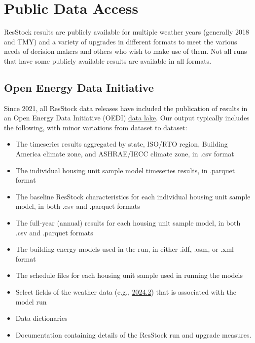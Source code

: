 \chapter{Public Data Access}

ResStock results are publicly available for multiple weather years (generally 2018 and TMY) and a variety of upgrades in different formats to meet the various needs of decision makers and others who wish to make use of them. Not all runs that have some publicly available results are available in all formats.

\section{Open Energy Data Initiative}  
Since 2021, all ResStock data releases have included the publication of results in an Open Energy Data Initiative (OEDI) \href{https://data.openei.org/s3_viewer?bucket=oedi-data-lake&prefix=nrel-pds-building-stock%2Fend-use-load-profiles-for-us-building-stock}{data lake}. Our output typically includes the following, with minor variations from dataset to dataset:
\begin{itemize}
    \item The timeseries results aggregated by state, ISO/RTO region, Building America climate zone, and ASHRAE/IECC climate zone, in .csv format
    \item The individual housing unit sample model timeseries results, in .parquet format
    \item The baseline ResStock characteristics for each individual housing unit sample model, in both .csv and .parquet formats
    \item The full-year (annual) results for each housing unit sample model, in both .csv and .parquet formats
    \item The building energy models used in the run, in either .idf, .osm, or .xml format
    \item The schedule files for each housing unit sample used in running the models
    \item Select fields of the weather data (e.g., \href{https://data.openei.org/s3_viewer?bucket=oedi-data-lake&prefix=nrel-pds-building-stock%2Fend-use-load-profiles-for-us-building-stock%2F2024%2Fresstock_tmy3_release_2%2Fweather%2F}{2024.2}) that is associated with the model run
    \item Data dictionaries
    \item Documentation containing details of the ResStock run and upgrade measures.
\end{itemize}
